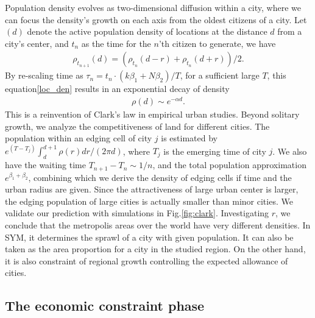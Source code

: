 \documentclass[reprint,unsortedaddress,amsmath,amssymb,aps,prl,showkeys]{revtex4-2}
\begin{document}

Population density evolves as two-dimensional diffusion within a city\cite{doi:10.1137/0150099}, where we can focus the density's growth on each axis from the oldest citizens of a city. Let $
(d)$ denote the active population density of locations at the distance $d$ from a city's center, and $t_n$ as the time for the $n$'th citizen to generate, we have 
\begin{align}
	\rho_{t_{n+1}}(d) = (\rho_{t_{n}}(d-r) + \rho_{t_{n}}(d+r) )/2.\label{loc_den}  
\end{align} By re-scaling time as $\tau_n = t_n\cdot (k\beta_1+N\beta_2)/T$, for a sufficient large $T$, this equation\@\ref{loc_den} results in an exponential decay of density
\begin{align}
	\rho(d)\sim e^{-\alpha d}\label{clark_eq}.
\end{align}
This is a reinvention of Clark's law in empirical urban studies\cite{clark1951urban}. Beyond solitary growth, we analyze the competitiveness of land for different cities. The population within an edging cell of city $j$ is estimated by $e^{(T-T_j)}\int_{d}^{d+1}\rho(r)dr/(2\pi d)$, where $T_j$ is the emerging time of city $j$. We also have the waiting time $T_{n+1}-T_{n}\sim 1/n$, and the total population approximation $e^{\beta_1+\beta_2}$, combining which we derive the density of edging cells if time and the urban radius are given. Since the attractiveness of large urban center is larger, the edging population of large cities is actually smaller than minor cities. We validate our prediction with simulations in Fig.\@\ref{fig:clark}. %
Investigating $r$, we conclude that the metropolis areas over the world have very different densities. In SYM, it determines the sprawl of a city with given population. It can also be taken as the area proportion for a city in the studied region. On the other hand, it is also constraint of regional growth controlling the expected allowance of cities. 

\subsection{The economic constraint phase}
\end{document}

